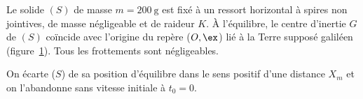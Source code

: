 \begin{minipage}{0.64\linewidth}
    Le solide $(S)$ de masse $m=\qty{200}{\gram}$ est fixé à un ressort
    horizontal à spires non jointives, de masse négligeable et de raideur $K$. À
    l'équilibre, le centre d'inertie $G$ de $(S)$ coïncide avec l'origine du
    repère ($O,\ex$) lié à la Terre supposé galiléen
    (figure~\ref{fig:solide_ressort}). Tous les frottements sont négligeables.
\end{minipage}
\hfill
\begin{minipage}{0.35\linewidth}
\begin{figure}[H]
    \centering
    
    \caption{}
    \label{fig:solide_ressort}
\end{figure}
\end{minipage}

On écarte ($S$) de sa position d'équilibre dans le sens positif d'une
distance $X_{m}$ et on l'abandonne sans vitesse initiale à $t_{0}=0$.

